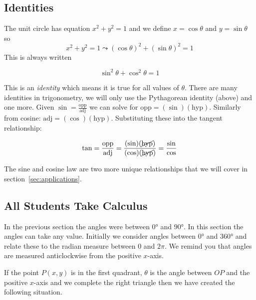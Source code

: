 \subsection*{Identities}\label{sec:identities}
The unit circle has equation $x^{2} +y^{2} =1$ and we define $x =\cos  \theta$ and $y =\sin  \theta$ so
\begin{equation*}x^{2} +y^{2} =1 \leadsto \left (\cos  \theta\right )^{2} +\left (\sin  \theta\right )^{2} =1
\end{equation*}
This is always written
\begin{tcolorbox}\[\sin ^{2} \theta +\cos ^{2} \theta =1\]
\end{tcolorbox}
This is an \emph{identity} which means it is true for all values of $\theta$. There are many identities in trigonometry, we will only use the Pythagorean identity (above) and one more.
Given $\sin =\frac{\text{opp}}{\text{adj}}$ we can solve for $\text{opp}=(\sin)(\text{hyp})$. Similarly from cosine:  $\text{adj}=(\cos)(\text{hyp})$. Substituting these into the tangent relationship:
\begin{tcolorbox}\[\tan=\frac{\text{opp}}{\text{adj}}=\frac{(\sin)(\cancel{\text{hyp}})}{(\cos)(\cancel{\text{hyp}})}=\frac{\sin}{\cos}\]
\end{tcolorbox}
The sine and cosine law are two more unique relationships that we will cover in section~\ref{sec:applications}.

\subsection*{All Students Take Calculus}
In the previous section the angles were between $\ang{0} $ and $\ang{90} $. In this section the angles can take any value. Initially we consider angles between $\ang{0} $ and $\ang{360} $ and relate these to the radian measure between $0$ and $2 \pi $. We remind you that angles are measured anticlockwise from the positive $x$-axis. 

If the point $P (x ,y)$ is in the first quadrant, $\theta $ is the angle between $OP$ and the positive $x$-axis and we complete the right triangle then we have created the following situation.  

